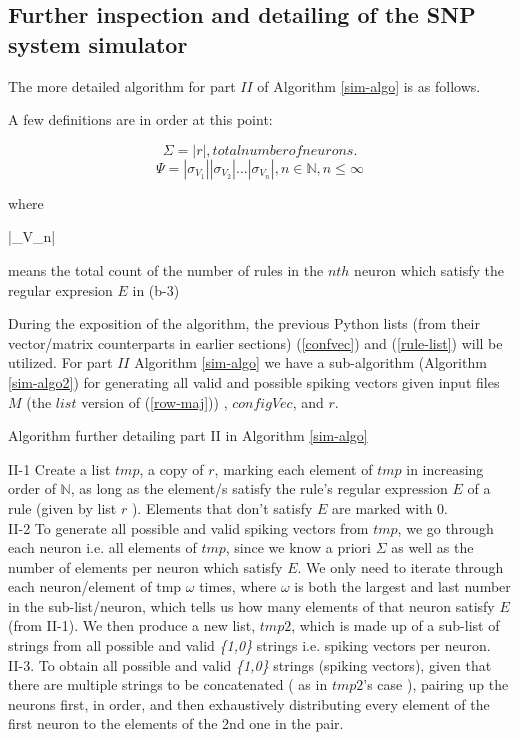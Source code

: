 \documentclass{acm_proc_article-sp}
\begin{document}
\subsection{Further inspection and detailing of the SNP system
simulator}
	
The more detailed algorithm for part $II$ of Algorithm \ref{sim-algo} is as follows.

A few definitions are in order at this point:

\begin{equation}\label{sigma}
\Sigma =  |r|, total number of neurons.
\end{equation}
\begin{equation}\label{psi}
\Psi = |{\sigma_V_1}| |{\sigma_V_2}| ...|{\sigma_V_n}|, n \in \mathbb{N}, n \leq \infty
\end{equation}

where

|{\sigma_V_n}|

means the total count of the number of rules in the $nth$ neuron which satisfy the regular expresion $E$ in (b-3)


During the exposition of the algorithm, the previous Python
lists (from their vector/matrix counterparts in earlier
sections) (\ref{confvec}) and (\ref{rule-list}) will be utilized. For part $II$ Algorithm \ref{sim-algo} we have a sub-algorithm (Algorithm \ref{sim-algo2}) for generating all valid
and possible spiking vectors given input files $M$ (the $list$ version of (\ref{row-maj})) , $configVec$, and $r$.

\begin{algorithm}
\caption{Algorithm further detailing part II in Algorithm \ref{sim-algo}}
\label{sim-algo2}
\begin{algorithmic}
II-1 Create a list $tmp$, a copy of $r$, marking
each element of $tmp$ in increasing order of $\mathbb N$,
as long as the element/s satisfy the rule's 
regular expression $E$ of a rule (given by list
$r$ ). Elements that don't satisfy $E$ are marked
 with 0.\\
 
II-2 To generate all possible and valid spiking vectors from
$tmp$, we go through each neuron i.e. all elements of $tmp$,
since we know a priori $\Sigma$ as well as the number of
elements per neuron which satisfy $E$. We only need to iterate
through each neuron/element of tmp $\omega$ times, where $\omega$ is
both the largest and last number in the sub-list/neuron,
which tells us how many elements of that neuron satisfy $E$
(from II-1). We then produce a new list, $tmp2$, which is
made up of a sub-list of strings from all possible and valid
\textit{\{1,0\}} strings i.e. spiking vectors per neuron.\\

II-3. To obtain all possible and valid \textit{\{1,0\}}
strings (spiking vectors), given that there are multiple strings
to be concatenated ( as in $tmp2$'s case ), pairing up the
neurons first, in order, and then exhaustively distributing
every element of the first neuron to the elements of the 2nd
one in the pair. 

\end{algorithmic}
\end{algorithm}
\end{document}
